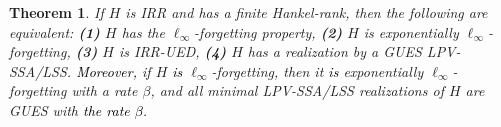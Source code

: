 \documentclass[journal,twoside,web]{ieeecolor}
\newtheorem{Theorem}{Theorem}[section]
\begin{document}
  \begin{Theorem}
  If $H$ is IRR and has a finite Hankel-rank, then the following are equivalent: \textbf{(1)} $H$ has the $\ell_{\infty}$-forgetting property, \textbf{(2)} $H$ is exponentially $\ell_{\infty}$-forgetting, \textbf{(3)} $H$ is IRR-UED, \textbf{(4)} $H$ has a realization by a GUES LPV-SSA/LSS. 
  \textcolor{black}{Moreover, }if $H$ \textcolor{black}{is} $\ell_{\infty}$-forgetting, then 
  it \textcolor{black}{is} exponentially $\ell_{\infty}$-forgetting with a rate $\beta$,
  and %
  all minimal LPV-SSA/LSS realizations of $H$ are GUES with \textcolor{black}{the rate $\beta$}. 
  \end{Theorem}
\end{document}
